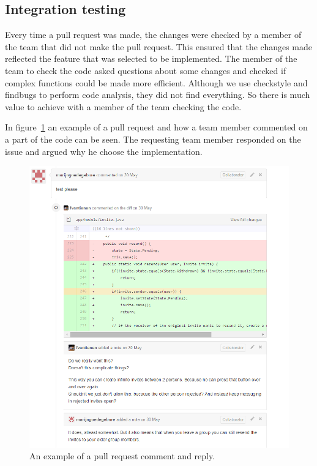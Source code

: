 \subsection{Integration testing}
\label{sec:integration}
Every time a pull request was made, the changes were checked by a member of the team that did not make the pull request.
This ensured that the changes made reflected the feature that was selected to be implemented.
The member of the team to check the code asked questions about some changes and checked if complex functions could be made more efficient.
Although we use checkstyle and findbugs to perform code analysis, they did not find everything.
So there is much value to achieve with a member of the team checking the code.

In figure~\ref{pullrequest-example} an example of a pull request and how a team member commented on a part of the code can be seen.
The requesting team member responded on the issue and argued why he choose the implementation.

\begin{figure}[H]
    \centering
    \includegraphics[width=\textwidth]{images/pullrequest-example1}
    \caption{An example of a pull request comment and reply.}
    \label{pullrequest-example}
\end{figure}

